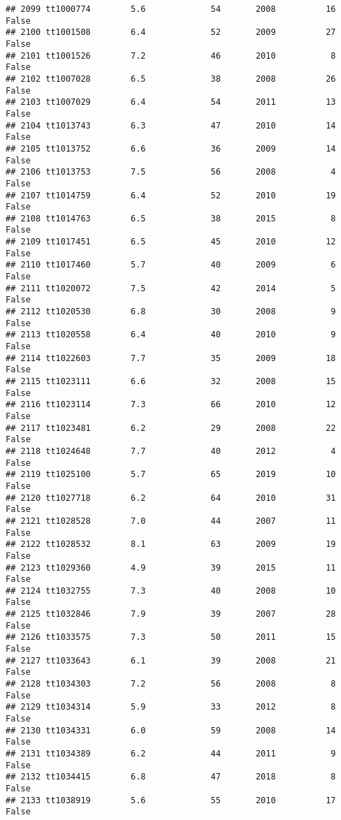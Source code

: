 \documentclass[
]{article}
\begin{document}
\begin{verbatim}
## 2099 tt1000774        5.6             54       2008          16   False
## 2100 tt1001508        6.4             52       2009          27   False
## 2101 tt1001526        7.2             46       2010           8   False
## 2102 tt1007028        6.5             38       2008          26   False
## 2103 tt1007029        6.4             54       2011          13   False
## 2104 tt1013743        6.3             47       2010          14   False
## 2105 tt1013752        6.6             36       2009          14   False
## 2106 tt1013753        7.5             56       2008           4   False
## 2107 tt1014759        6.4             52       2010          19   False
## 2108 tt1014763        6.5             38       2015           8   False
## 2109 tt1017451        6.5             45       2010          12   False
## 2110 tt1017460        5.7             40       2009           6   False
## 2111 tt1020072        7.5             42       2014           5   False
## 2112 tt1020530        6.8             30       2008           9   False
## 2113 tt1020558        6.4             40       2010           9   False
## 2114 tt1022603        7.7             35       2009          18   False
## 2115 tt1023111        6.6             32       2008          15   False
## 2116 tt1023114        7.3             66       2010          12   False
## 2117 tt1023481        6.2             29       2008          22   False
## 2118 tt1024648        7.7             40       2012           4   False
## 2119 tt1025100        5.7             65       2019          10   False
## 2120 tt1027718        6.2             64       2010          31   False
## 2121 tt1028528        7.0             44       2007          11   False
## 2122 tt1028532        8.1             63       2009          19   False
## 2123 tt1029360        4.9             39       2015          11   False
## 2124 tt1032755        7.3             40       2008          10   False
## 2125 tt1032846        7.9             39       2007          28   False
## 2126 tt1033575        7.3             50       2011          15   False
## 2127 tt1033643        6.1             39       2008          21   False
## 2128 tt1034303        7.2             56       2008           8   False
## 2129 tt1034314        5.9             33       2012           8   False
## 2130 tt1034331        6.0             59       2008          14   False
## 2131 tt1034389        6.2             44       2011           9   False
## 2132 tt1034415        6.8             47       2018           8   False
## 2133 tt1038919        5.6             55       2010          17   False

\end{verbatim}
\end{document}
